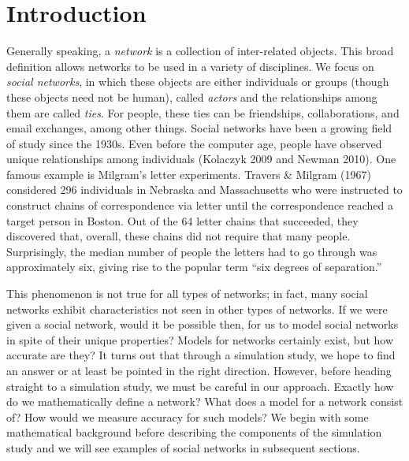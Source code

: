 \documentclass[12pt,twoside]{amherstthesis}
\begin{document}
  
  \mainmatter %
  \pagestyle{fancyplain} %

  \onehalfspacing
  
  \chapter*{Introduction}\label{introduction}
  
  Generally speaking, a \emph{network} is a collection of inter-related
  objects. This broad definition allows networks to be used in a variety
  of disciplines. We focus on \emph{social networks}, in which these
  objects are either individuals or groups (though these objects need not
  be human), called \emph{actors} and the relationships among them are
  called \emph{ties}. For people, these ties can be friendships,
  collaborations, and email exchanges, among other things. Social networks
  have been a growing field of study since the 1930s. Even before the
  computer age, people have observed unique relationships among
  individuals (Kolaczyk 2009 and Newman 2010). One famous example is
  Milgram's letter experiments. Travers \& Milgram (1967) considered 296
  individuals in Nebraska and Massachusetts who were instructed to
  construct chains of correspondence via letter until the correspondence
  reached a target person in Boston. Out of the 64 letter chains that
  succeeded, they discovered that, overall, these chains did not require
  that many people. Surprisingly, the median number of people the letters
  had to go through was approximately six, giving rise to the popular term
  ``six degrees of separation.''
  
  This phenomenon is not true for all types of networks; in fact, many
  social networks exhibit characteristics not seen in other types of
  networks. If we were given a social network, would it be possible then,
  for us to model social networks in spite of their unique properties?
  Models for networks certainly exist, but how accurate are they? It turns
  out that through a simulation study, we hope to find an answer or at
  least be pointed in the right direction. However, before heading
  straight to a simulation study, we must be careful in our approach.
  Exactly how do we mathematically define a network? What does a model for
  a network consist of? How would we measure accuracy for such models? We
  begin with some mathematical background before describing the components
  of the simulation study and we will see examples of social networks in
  subsequent sections.
  
\end{document}
